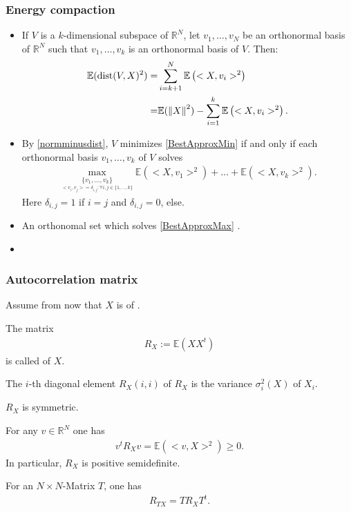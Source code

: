 \begin{frame}\frametitle{Energy compaction}
\begin{itemize}
\item If $V$ is a $k$-dimensional subspace of $\mathbb{R}^N$, let $v_1,\dots,v_N$ be an orthonormal basis of $\mathbb{R}^N$ such 
that $v_1,\dots,v_k$ is an orthonormal basis of $V$. Then:
\begin{align}\label{normminusdist}
\mathbb{E}(\operatorname{dist}(V,X)^2)=&\sum_{i=k+1}^N\mathbb{E}\left(<X,v_i>^2\right)\nonumber\\
=&\mathbb{E}(\left\|X\right\|^2)-\sum_{i=1}^k\mathbb{E}\left(<X,v_i>^2\right).
\end{align}
\item By \eqref{normminusdist}, $V$ minimizes \eqref{BestApproxMin} if and only if each orthonormal basis $v_1,\dots,v_k$ of $V$ solves
\begin{align}\label{BestApproxMax}
\underset{\underset{<v_i,v_j>=\delta_{i,j} \colon \forall i,j\in\{1,\dots,k\}}{\{v_1,\dots,v_k\}}}{\max}\mathbb{E}(<X,v_1>^2)+\dots+\mathbb{E}(<X,v_k>^2).
\end{align} 
Here $\delta_{i,j}=1$ if $i=j$ and $\delta_{i,j}=0$, else.
\item An orthonomal set which solves \eqref{BestApproxMax} . 
\item[\iarrow] 
\end{itemize}
\end{frame}


\begin{frame}\frametitle{Autocorrelation matrix} 
\bit
\item Assume from now that $X$ is of . 
\item The matrix 
\begin{align*}
R_X:=\mathbb{E}(XX^t)
\end{align*}
is called of $X$.
\eit

\bit
\item The $i$-th diagonal element $R_X(i,i)$ of $R_X$ is the variance $\sigma_i^2(X)$
of $X_i$. 
\item $R_X$ is symmetric.
\item For any $v\in\mathbb{R}^N$ one has 
\begin{align*}
v^tR_Xv=\mathbb{E}(<v,X>^2)\geq 0.
\end{align*}
In particular, $R_X$ is positive semidefinite. 
\item For an $N\times N$-Matrix $T$, one has 
\begin{align*}
R_{TX}=TR_XT^t. 
\end{align*}
\eit
\end{frame}

